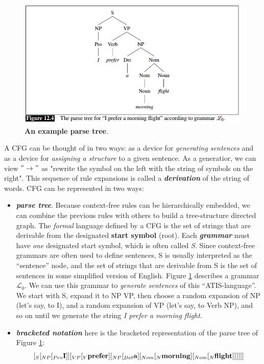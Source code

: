\documentclass[11pt]{article}
\begin{document}
\begin{figure}
\begin{minipage}[t]{1\linewidth}
  \centering
  \centerline{\includegraphics[scale = 0.5]{parse_tree_2.png}}
\end{minipage}
\caption{\footnotesize{\textbf{An example parse tree}.}}
\label{fig: parse_tree2}
\end{figure}

A CFG can be thought of in two ways: as a device for \emph{generating sentences} and as a device for \emph{assigning a structure} to a given sentence. As a generatior, we can view $"\rightarrow"$ as "{rewrite the symbol on the left with the string of symbols on the right}". This sequence of rule expansions is called a
\emph{\textbf{derivation}}  of the string of words. CFG can be represented in two ways:
\begin{itemize}
\item \emph{\textbf{parse tree}}. Because context-free rules can be hierarchically embedded,  we can combine the previous rules with others to build a tree-structure directed graph.  The \emph{formal} language defined by a CFG is the set of strings that are derivable from the designated \textbf{start symbol} (root). Each \emph{\textbf{grammar}} must have \emph{one} designated start symbol, which is often called \emph{S}. Since context-free grammars are often used to define sentences, S is usually interpreted as the “sentence” node, and the set of strings that are derivable from S is the set of sentences in some simplified version of English. Figure \ref{fig: parse_tree2} describes a grammar $\mathcal{L}_{0}$. We can use this grammar to \emph{generate sentences} of this “ATIS-language”. We start with S, expand it to NP VP, then choose a random expansion of NP (let’s say, to
I), and a random expansion of VP (let’s say, to Verb NP), and so on until we generate the string \emph{I prefer a morning flight}. 

\item  \emph{\textbf{bracketed notation}} here is the bracketed representation of the parse tree of Figure \ref{fig: parse_tree2}: $$[_{S} [_{NP} [_{Pro} \text{\textbf{I}}]] [_{VP} [_{V} \text{\textbf{prefer}}] [_{NP} [_{Det} \text{\textbf{a}}] [_{Nom} [_{N} \text{\textbf{morning}}] [_{Nom} [_{N} \text{\textbf{flight}}]]]]]]$$
\end{itemize}
\end{document}
